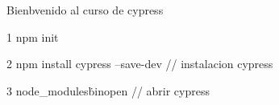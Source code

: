 Bienbvenido al curso de cypress

1 npm init

2 npm install cypress --save-dev  // instalacion cypress

3 node_modules\.bin\cypress open // abrir cypress